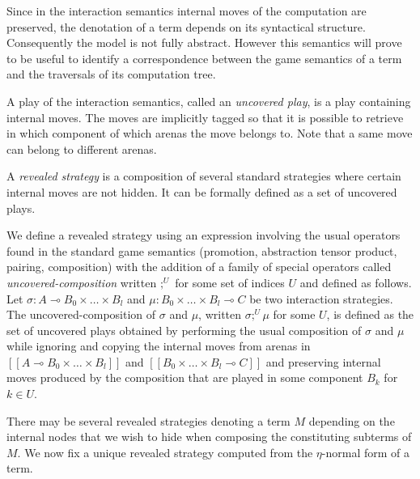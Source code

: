 \documentclass{llncs}
\newcommand{\lsem}{[\![} %
\newcommand{\rsem}{]\!]} %
\newcommand{\sem}[1]{{\lsem #1 \rsem}}
\begin{document}
Since in the interaction semantics internal moves of the computation are preserved, the denotation of a term depends on its 
syntactical structure. Consequently the model is not fully abstract. However this semantics will prove to be useful to identify
a correspondence between the game semantics of a term and the traversals of its computation tree.

A play of the interaction semantics, called an \emph{uncovered play}, is a play containing internal moves.
The moves are implicitly tagged so that it is possible to retrieve in which component
of which arenas the move belongs to. Note that a same move can belong to different arenas.

A \emph{revealed strategy} is a composition of several standard strategies where
certain internal moves are not hidden. It can be formally defined as a set
of uncovered plays.

We define a revealed strategy using an expression involving the usual operators found in the standard game semantics (promotion, abstraction
tensor product, pairing, composition) with the addition of a family of special operators called \emph{uncovered-composition} written 
$;^U$ for some set of indices $U$ and defined as follows.
Let $\sigma : A \multimap B_0 \times \ldots \times B_l$ and $\mu : B_0 \times
\ldots \times B_l \multimap C$ be two interaction strategies.
The uncovered-composition of $\sigma$ and $\mu$, written $\sigma ;^U \mu$ for some $U$, is defined as
the set of uncovered plays obtained by performing the usual composition of $\sigma$ and $\mu$
while ignoring and copying the internal moves from arenas in
$\sem{A \multimap B_0 \times \ldots \times B_l}$ and $\sem{B_0 \times
\ldots \times B_l \multimap C}$ and preserving internal
moves produced by the composition that are played in some component $B_k$ for $k \in U$.

There may be several revealed strategies denoting a term $M$ depending on the internal nodes that we wish to hide when
composing the constituting subterms of $M$. We now fix a unique revealed strategy computed from the $\eta$-normal
form of a term.
\end{document}
